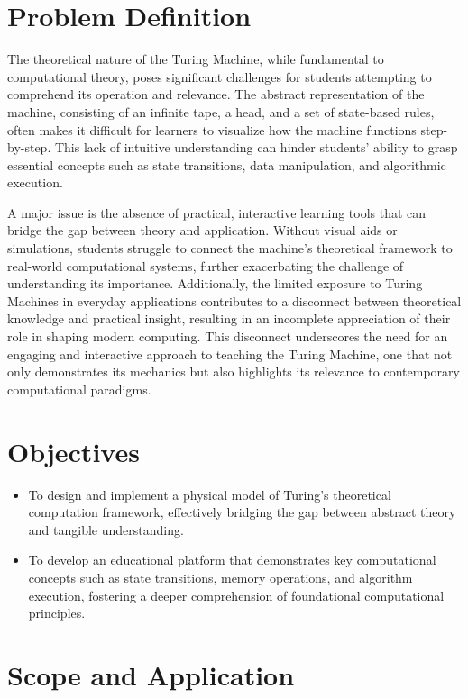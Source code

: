 \section{Problem Definition}

The theoretical nature of the Turing Machine, while fundamental to computational theory, poses significant challenges for students attempting to comprehend its operation and relevance. The abstract representation of the machine, consisting of an infinite tape, a head, and a set of state-based rules, often makes it difficult for learners to visualize how the machine functions step-by-step. This lack of intuitive understanding can hinder students’ ability to grasp essential concepts such as state transitions, data manipulation, and algorithmic execution.

A major issue is the absence of practical, interactive learning tools that can bridge the gap between theory and application. Without visual aids or simulations, students struggle to connect the machine's theoretical framework to real-world computational systems, further exacerbating the challenge of understanding its importance. Additionally, the limited exposure to Turing Machines in everyday applications contributes to a disconnect between theoretical knowledge and practical insight, resulting in an incomplete appreciation of their role in shaping modern computing. This disconnect underscores the need for an engaging and interactive approach to teaching the Turing Machine, one that not only demonstrates its mechanics but also highlights its relevance to contemporary computational paradigms.


\section{Objectives}

\begin{itemize}
    \item To design and implement a physical model of Turing’s theoretical computation framework, effectively bridging the gap between abstract theory and tangible understanding.
    \item To develop an educational platform that demonstrates key computational concepts such as state transitions, memory operations, and algorithm execution, fostering a deeper comprehension of foundational computational principles.
\end{itemize}

\section{Scope and Application}

